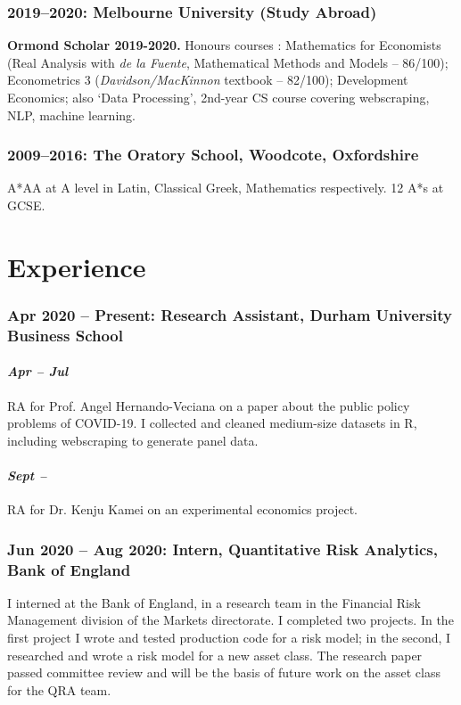 \documentclass[a4]{article}
\begin{document}
\subsubsection*{2019--2020: Melbourne University (Study Abroad)}
\textbf{Ormond Scholar 2019-2020.} Honours courses : Mathematics for Economists (Real Analysis with \textit{de la Fuente}, Mathematical Methods and Models  -- 86/100); Econometrics 3 (\textit{Davidson/MacKinnon} textbook -- 82/100);  Development Economics; also `Data Processing', 2nd-year CS course covering webscraping, NLP, machine learning.

\subsubsection*{2009--2016: The Oratory School, Woodcote, Oxfordshire}
A*AA at A level in Latin, Classical Greek, Mathematics respectively. 12 A*s at GCSE.
  

\section*{Experience}
\subsubsection*{Apr 2020 -- Present: Research Assistant, Durham University Business School}
\paragraph*{\textit{Apr -- Jul}} RA for Prof. Angel Hernando-Veciana on a paper about the public policy problems of COVID-19. I collected and cleaned medium-size datasets in R, including webscraping to generate panel data.%
\paragraph{\textit{Sept --}} RA for Dr. Kenju Kamei on an experimental economics project.

\subsubsection*{Jun 2020 -- Aug 2020: Intern, Quantitative Risk Analytics, Bank of England}
I interned at the Bank of England, in a research team in the Financial Risk Management division of the Markets directorate. I completed two projects. In the first project I wrote and tested production code for a risk model; in the second, I researched and wrote a risk model for a new asset class. The research paper passed committee review and will be the basis of future work on the asset class for the QRA team. 
\end{document}
